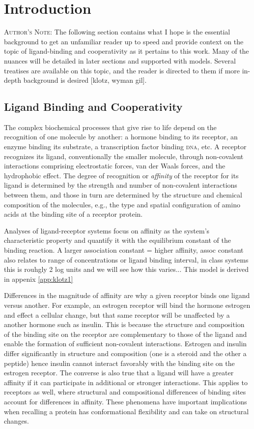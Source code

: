 \section{Introduction}

\textsc{Author's Note}: The following section contains what I hope is the essential background to get an unfamiliar reader up to speed and provide context on the topic of ligand-binding and cooperativity as it pertains to this work. Many of the nuances will be detailed in later sections and supported with models. Several treatises are available on this topic, and the reader is directed to them if more in-depth background is desired [klotz, wyman gil].

\subsection{Ligand Binding and Cooperativity}

The complex biochemical processes that give rise to life depend on the recognition of one molecule by another: a hormone binding to its receptor, an enzyme binding its substrate, a transcription factor binding \textsc{dna}, etc. A receptor recognizes its ligand, conventionally the smaller molecule, through non-covalent interactions comprising electrostatic forces, van der Waals forces, and the hydrophobic effect. The degree of recognition or \emph{affinity} of the receptor for its ligand is determined by the strength and number of non-covalent interactions between them, and those in turn are determined by the structure and chemical composition of the molecules, e.g., the type and spatial configuration of amino acids at the binding site of a receptor protein. 

Analyses of ligand-receptor systems focus on affinity as the system's characteristic property and quantify it with the equilibrium constant of the binding reaction. A larger association constant = higher affinity, assoc constant also relates to range of concentrations or ligand binding interval, in class systems this is rouhgly 2 log units and we will see how this varies... This model is derived in appenix \ref{app:klotz1}

Differences in the magnitude of affinity are why a given receptor binds one ligand versus another. For example, an estrogen receptor will bind the hormone estrogen and effect a cellular change, but that same receptor will be unaffected by a another hormone such as insulin. This is because the structure and composition of the binding site on the receptor are complementary to those of the ligand and enable the formation of sufficient non-covalent interactions. Estrogen and insulin differ significantly in structure and composition (one is a steroid and the other a peptide) hence insulin cannot interact favorably with the binding site on the estrogen receptor. The converse is also true that a ligand will have a greater affinity if it can participate in additional or stronger interactions. This applies to receptors as well, where structural and compositional differences of binding sites account for differences in affinity. These phenomena have important implications when recalling a protein has conformational flexibility and can take on structural changes.


